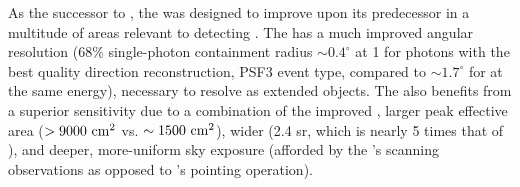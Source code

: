 As the successor to \egret{}, the \lat{} was designed to improve upon its predecessor in a multitude of areas relevant to detecting \snrs{} \citep{atwood09,lat_perf}. The \lat{} has a much improved angular resolution (68\% single-photon containment radius $\sim 0.4^{\circ}$ at 1\gev{} for photons with the best quality direction reconstruction, PSF3 event type, compared to $\sim 1.7^{\circ}$ for \egret{} at the same energy), necessary to resolve \snrs{} as extended objects. The \lat{} also benefits from a superior sensitivity due to a combination of the improved \psf, larger peak effective area ($ {\rm > 9000~cm^2}$ vs. ${\rm \sim 1500~cm^2}$), wider \fov{} (2.4 sr, which is nearly 5 times that of \egret{}), and deeper, more-uniform sky exposure (afforded by the \lat's scanning observations as opposed to \egret's pointing operation). 

